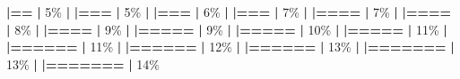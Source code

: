 \documentclass[
]{book}
\newenvironment{Shaded}{\begin{snugshade}}{\end{snugshade}}
\newcommand{\DecValTok}[1]{\textcolor[rgb]{0.00,0.00,0.81}{#1}}
\newcommand{\ErrorTok}[1]{\textcolor[rgb]{0.64,0.00,0.00}{\textbf{#1}}}
\newcommand{\NormalTok}[1]{#1}
\newcommand{\SpecialCharTok}[1]{\textcolor[rgb]{0.81,0.36,0.00}{\textbf{#1}}}
\begin{document}
\begin{Shaded}
\begin{Highlighting}[]
  \ErrorTok{|==}                                                \ErrorTok{|}   \DecValTok{5}\NormalTok{\%}
  \SpecialCharTok{|}                                                        
  \ErrorTok{|===}                                               \ErrorTok{|}   \DecValTok{5}\NormalTok{\%}
  \SpecialCharTok{|}                                                        
  \ErrorTok{|===}                                               \ErrorTok{|}   \DecValTok{6}\NormalTok{\%}
  \SpecialCharTok{|}                                                        
  \ErrorTok{|===}                                               \ErrorTok{|}   \DecValTok{7}\NormalTok{\%}
  \SpecialCharTok{|}                                                        
  \ErrorTok{|====}                                              \ErrorTok{|}   \DecValTok{7}\NormalTok{\%}
  \SpecialCharTok{|}                                                        
  \ErrorTok{|====}                                              \ErrorTok{|}   \DecValTok{8}\NormalTok{\%}
  \SpecialCharTok{|}                                                        
  \ErrorTok{|====}                                              \ErrorTok{|}   \DecValTok{9}\NormalTok{\%}
  \SpecialCharTok{|}                                                        
  \ErrorTok{|=====}                                             \ErrorTok{|}   \DecValTok{9}\NormalTok{\%}
  \SpecialCharTok{|}                                                        
  \ErrorTok{|=====}                                             \ErrorTok{|}  \DecValTok{10}\NormalTok{\%}
  \SpecialCharTok{|}                                                        
  \ErrorTok{|=====}                                             \ErrorTok{|}  \DecValTok{11}\NormalTok{\%}
  \SpecialCharTok{|}                                                        
  \ErrorTok{|======}                                            \ErrorTok{|}  \DecValTok{11}\NormalTok{\%}
  \SpecialCharTok{|}                                                        
  \ErrorTok{|======}                                            \ErrorTok{|}  \DecValTok{12}\NormalTok{\%}
  \SpecialCharTok{|}                                                        
  \ErrorTok{|======}                                            \ErrorTok{|}  \DecValTok{13}\NormalTok{\%}
  \SpecialCharTok{|}                                                        
  \ErrorTok{|=======}                                           \ErrorTok{|}  \DecValTok{13}\NormalTok{\%}
  \SpecialCharTok{|}                                                        
  \ErrorTok{|=======}                                           \ErrorTok{|}  \DecValTok{14}\NormalTok{\%}

\end{Highlighting}
\end{Shaded}
\end{document}
